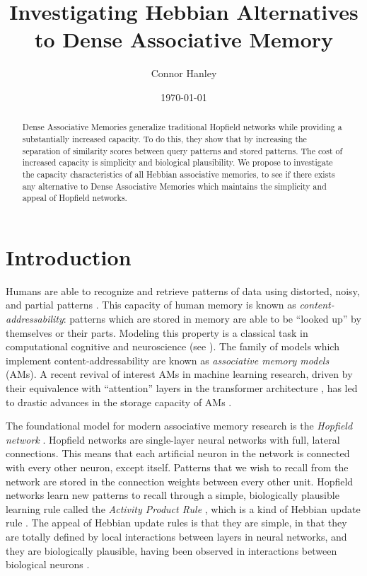 \documentclass{article}
\title{Investigating Hebbian Alternatives to Dense Associative Memory}
\author{Connor Hanley}
\date{\today}
\theoremstyle{definition}
\begin{document}
\maketitle

\begin{abstract}
  Dense Associative Memories generalize traditional Hopfield networks
  while providing a substantially increased capacity. To do this,
  they show that by increasing the separation of similarity scores
  between query patterns and stored patterns. The cost of increased
  capacity is simplicity and biological plausibility. We propose
  to investigate the capacity characteristics of all Hebbian
  associative memories, to see if there exists any alternative to
  Dense Associative Memories which maintains the simplicity and
  appeal of Hopfield networks.
\end{abstract}

\section{Introduction}

Humans are able to recognize and retrieve patterns of data using distorted,
noisy, and partial patterns \parencite{rumelhart_general_1986}. This
capacity of human memory is known as \textit{content-addressability}: patterns
which are stored in memory are able to be ``looked up'' by themselves or their
parts. Modeling this property is a classical task in computational cognitive
and neuroscience (see \textcites{marr_simple_1971,little_existence_1974,
amari_learning_1972,nakano_associatron-model_1972,stanley_simulation_1976}).
The family of models which implement content-addressability are known
as \textit{associative memory models} (AMs).
A recent revival of interest AMs in machine learning research,
driven by their equivalence with ``attention'' layers in the transformer
architecture \parencites{vaswani_attention_2023, ramsauer_hopfield_2021},
has led to drastic advances in the storage capacity of AMs
\parencites{demircigil_model_2017,krotov_dense_2016,hu_provably_2024}.

The foundational model for modern associative memory research is the
\textit{Hopfield network}
\parencites{hopfield_neural_1982,hopfield_neurons_1984}.
Hopfield networks are single-layer neural networks with full, lateral
connections.
This means that each artificial neuron in the network is connected with every
other neuron, except itself. Patterns that we wish to recall from the network
are stored in the connection weights between every other unit. Hopfield
networks learn new patterns to recall through a simple, biologically plausible
learning rule called the \textit{Activity Product Rule}
\parencite{haykin_neural_2009},
which is a kind of Hebbian update rule \parencite{hebb_organization_1949}.
The appeal of Hebbian update rules is that they are simple, in that they
are totally defined by local interactions between layers in neural networks,
and they are biologically plausible, having been observed in interactions
between biological neurons
\parencites{rolls_mechanisms_2013,bi_synaptic_1998,markram_regulation_1997}.
\end{document}
